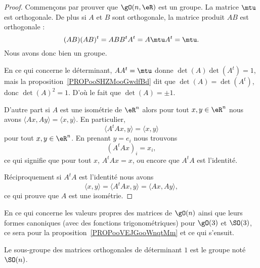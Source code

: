 \begin{proof}
	Commençons par prouver que \( \gO(n,\eR)\) est un groupe. La matrice \( \mtu\) est orthogonale. De plus si \( A\) et \( B\) sont orthogonale, la matrice produit \( AB\) est orthogonale :
	\begin{equation}
		(AB)(AB)^t=ABB^tA^t=A\mtu A^t=\mtu.
	\end{equation}
	Nous avons donc bien un groupe.

	En ce qui concerne le déterminant, \( AA^t=\mtu\) donne \( \det(A)\det(A^t)=1\), mais la proposition~\ref{PROPooSHZMooGwdfBd} dit que \( \det(A)=\det(A^t)\), donc \( \det(A)^2=1\). D'où le fait que \( \det(A)=\pm 1\).

	D'autre part si \( A\) est une isométrie de \( \eR^n\) alors pour tout \( x,y\in \eR^n\) nous avons \( \langle Ax, Ay\rangle =\langle x, y\rangle \). En particulier,
	\begin{equation}
		\langle A^tAx, y\rangle =\langle x, y\rangle
	\end{equation}
	pour tout \( x,y\in \eR^n\). En prenant \( y=e_i\) nous trouvons
	\begin{equation}
		(A^tAx)_i=x_i,
	\end{equation}
	ce qui signifie que pour tout \( x\), \( A^tAx=x\), ou encore que \( A^tA\) est l'identité.

	Réciproquement si \( A^tA\) est l'identité nous avons
	\begin{equation}
		\langle x, y\rangle =\langle A^tAx, y\rangle =\langle Ax, Ay\rangle ,
	\end{equation}
	ce qui prouve que \( A\) est une isométrie.
\end{proof}

En ce qui concerne les valeurs propres des matrices de \( \gO(n)\) ainsi que leurs formes canoniques (avec des fonctions trigonométriques) pour \( \gO(3)\) et \( \SO(3)\), ce sera pour la proposition~\ref{PROPooVEJGooWnqtMm} et ce qui s'ensuit.

\begin{definition}      \label{DEFooJLNQooBKTYUy}
	Le sous-groupe des matrices orthogonales de déterminant \( 1\) est le groupe  noté \( \SO(n)\).
\end{definition}
